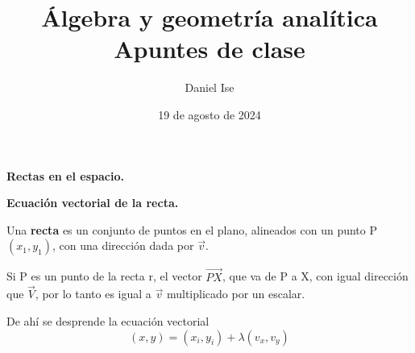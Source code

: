 \documentclass{article}
\title{Álgebra y geometría analítica\\Apuntes de clase}
\author{Daniel Ise}
\date{19 de agosto de 2024}
\begin{document}
\maketitle

\textbf{Rectas en el espacio.} 

\textbf{Ecuación vectorial de la recta.}

Una \textbf{recta} es un conjunto de puntos en el plano, alineados con un punto
P $(x_1,y_1)$, con una dirección dada por $\vec{v}$. 

Si P es un punto de la recta r, el vector $\vec{PX}$, que va de P a X, con igual
dirección que $\vec{V}$, por lo tanto es igual a $\vec{v}$ multiplicado por un
escalar.

De ahí se desprende la ecuación vectorial 
$$(x,y) = (x_i, y_i) + \lambda (v_x, v_y)$$
\end{document}

